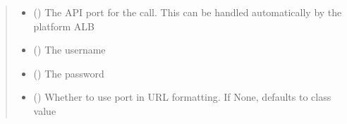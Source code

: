 \documentclass[letterpaper,10pt,english]{sphinxmanual}
\begin{document}
\begin{fulllineitems}
\begin{fulllineitems}
\begin{quote}
\begin{description}
\begin{itemize}
\item {} 
\sphinxAtStartPar
{} (\sphinxstyleliteralemphasis{\sphinxupquote{ (}}\sphinxstyleliteralemphasis{\sphinxupquote{)}}) \textendash{} The API port for the call. This can be handled automatically by the platform ALB

\item {} 
\sphinxAtStartPar
{} (\sphinxstyleliteralemphasis{\sphinxupquote{ (}}\sphinxstyleliteralemphasis{\sphinxupquote{)}}) \textendash{} The username

\item {} 
\sphinxAtStartPar
{} (\sphinxstyleliteralemphasis{\sphinxupquote{ (}}\sphinxstyleliteralemphasis{\sphinxupquote{)}}) \textendash{} The password

\item {} 
\sphinxAtStartPar
{} (\sphinxstyleliteralemphasis{\sphinxupquote{ (}}\sphinxstyleliteralemphasis{\sphinxupquote{)}}) \textendash{} Whether to use port in URL formatting. If None, defaults to class value

\end{itemize}

\end{description}\end{quote}

\end{fulllineitems}



\end{fulllineitems}
\end{document}
